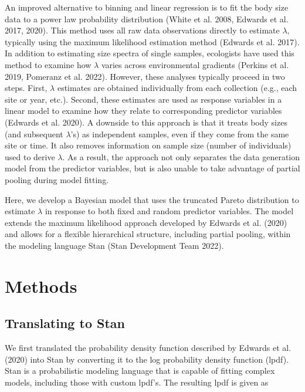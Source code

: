 \documentclass[
  12pt,
]{article}
\numberwithin{equation}
\begin{document}
An improved alternative to binning and linear regression is to fit the
body size data to a power law probability distribution (White et al.
2008, Edwards et al. 2017, 2020). This method uses all raw data
observations directly to estimate \(\lambda\), typically using the
maximum likelihood estimation method (Edwards et al. 2017). In addition
to estimating size spectra of single samples, ecologists have used this
method to examine how \(\lambda\) varies across environmental gradients
(Perkins et al. 2019, Pomeranz et al. 2022). However, these analyses
typically proceed in two steps. First, \(\lambda\) estimates are
obtained individually from each collection (e.g., each site or year,
etc.). Second, these estimates are used as response variables in a
linear model to examine how they relate to corresponding predictor
variables (Edwards et al. 2020). A downside to this approach is that it
treats body sizes (and subsequent \(\lambda\)'s) as independent samples,
even if they come from the same site or time. It also removes
information on sample size (number of individuals) used to derive
\(\lambda\). As a result, the approach not only separates the data
generation model from the predictor variables, but is also unable to
take advantage of partial pooling during model fitting.

Here, we develop a Bayesian model that uses the truncated Pareto
distribution to estimate \(\lambda\) in response to both fixed and
random predictor variables. The model extends the maximum likelihood
approach developed by Edwards et al. (2020) and allows for a flexible
hierarchical structure, including partial pooling, within the modeling
language Stan (Stan Development Team 2022).

\hypertarget{methods}{%
\section{Methods}\label{methods}}

\hypertarget{translating-to-stan}{%
\subsection{Translating to Stan}\label{translating-to-stan}}

We first translated the probability density function described by
Edwards et al. (2020) into Stan by converting it to the log probability
density function (lpdf). Stan is a probabilistic modeling language that
is capable of fitting complex models, including those with custom
lpdf's. The resulting lpdf is given as
\end{document}
